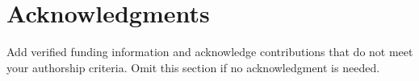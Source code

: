 \section{Acknowledgments}
\label{sec:acknowledgments}

Add verified funding information and acknowledge contributions that do not meet your authorship criteria. Omit this section if no acknowledgment is needed.
